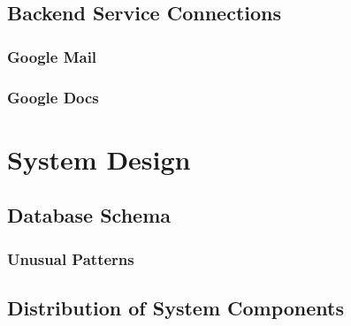 \subsection{Backend Service Connections}

\subsubsection{Google Mail}

\subsubsection{Google Docs}


\section{System Design}

\subsection{Database Schema}

\subsubsection{Unusual Patterns}

\subsection{Distribution of System Components}




